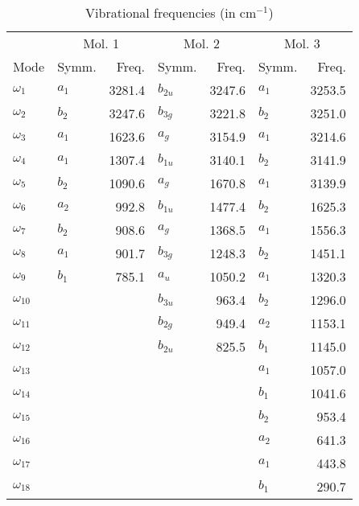 \begin{table}
\centering
\caption{Vibrational frequencies (in cm$^{-1}$)}
\begin{tabular}{llrlrlr}
 & \multicolumn{2}{c}{Mol. 1} & \multicolumn{2}{c}{Mol. 2} & \multicolumn{2}{c}{Mol. 3} \\
Mode &    Symm. &    Freq. &    Symm. &    Freq. &    Symm. &    Freq. \\
\hline
 $\omega_{1 }$ & $   a_1$ &   3281.4 & $b_{2u}$ &   3247.6 & $   a_1$ &   3253.5 \\
 $\omega_{2 }$ & $   b_2$ &   3247.6 & $b_{3g}$ &   3221.8 & $   b_2$ &   3251.0 \\
 $\omega_{3 }$ & $   a_1$ &   1623.6 & $   a_g$ &   3154.9 & $   a_1$ &   3214.6 \\
 $\omega_{4 }$ & $   a_1$ &   1307.4 & $b_{1u}$ &   3140.1 & $   b_2$ &   3141.9 \\
 $\omega_{5 }$ & $   b_2$ &   1090.6 & $   a_g$ &   1670.8 & $   a_1$ &   3139.9 \\
 $\omega_{6 }$ & $   a_2$ &    992.8 & $b_{1u}$ &   1477.4 & $   b_2$ &   1625.3 \\
 $\omega_{7 }$ & $   b_2$ &    908.6 & $   a_g$ &   1368.5 & $   a_1$ &   1556.3 \\
 $\omega_{8 }$ & $   a_1$ &    901.7 & $b_{3g}$ &   1248.3 & $   b_2$ &   1451.1 \\
 $\omega_{9 }$ & $   b_1$ &    785.1 & $   a_u$ &   1050.2 & $   a_1$ &   1320.3 \\
 $\omega_{10}$ &          &          & $b_{3u}$ &    963.4 & $   b_2$ &   1296.0 \\
 $\omega_{11}$ &          &          & $b_{2g}$ &    949.4 & $   a_2$ &   1153.1 \\
 $\omega_{12}$ &          &          & $b_{2u}$ &    825.5 & $   b_1$ &   1145.0 \\
 $\omega_{13}$ &          &          &          &          & $   a_1$ &   1057.0 \\
 $\omega_{14}$ &          &          &          &          & $   b_1$ &   1041.6 \\
 $\omega_{15}$ &          &          &          &          & $   b_2$ &    953.4 \\
 $\omega_{16}$ &          &          &          &          & $   a_2$ &    641.3 \\
 $\omega_{17}$ &          &          &          &          & $   a_1$ &    443.8 \\
 $\omega_{18}$ &          &          &          &          & $   b_1$ &    290.7 \\

\end{tabular}
\end{table}

